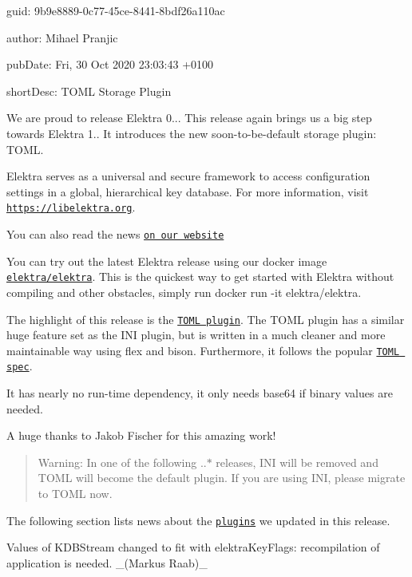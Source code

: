 
\begin{DoxyItemize}
\item guid\+: 9b9e8889-\/0c77-\/45ce-\/8441-\/8bdf26a110ac
\item author\+: Mihael Pranjic
\item pub\+Date\+: Fri, 30 Oct 2020 23\+:03\+:43 +0100
\item short\+Desc\+: T\+O\+ML Storage Plugin
\end{DoxyItemize}

We are proud to release Elektra 0... This release again brings us a big step towards Elektra 1.. It introduces the new soon-\/to-\/be-\/default storage plugin\+: T\+O\+ML.

Elektra serves as a universal and secure framework to access configuration settings in a global, hierarchical key database. For more information, visit \href{https://libelektra.org}{\tt https\+://libelektra.\+org}.

You can also read the news \href{https://www.libelektra.org/news/0.9.3-release}{\tt on our website}

You can try out the latest Elektra release using our docker image \href{https://hub.docker.com/r/elektra/elektra}{\tt elektra/elektra}. This is the quickest way to get started with Elektra without compiling and other obstacles, simply run {\ttfamily docker run -\/it elektra/elektra}.

The highlight of this release is the \href{https://www.libelektra.org/plugins/toml}{\tt T\+O\+ML plugin}. The T\+O\+ML plugin has a similar huge feature set as the I\+NI plugin, but is written in a much cleaner and more maintainable way using flex and bison. Furthermore, it follows the popular \href{https://toml.io}{\tt T\+O\+ML spec}.

It has nearly no run-\/time dependency, it only needs {\ttfamily base64} if binary values are needed.

A huge thanks to Jakob Fischer for this amazing work!

\begin{quote}
Warning\+: In one of the following {..$\ast$} releases, I\+NI will be removed and T\+O\+ML will become the default plugin. If you are using I\+NI, please migrate to T\+O\+ML now. \end{quote}


The following section lists news about the \href{https://www.libelektra.org/plugins/readme}{\tt plugins} we updated in this release.


\begin{DoxyItemize}
\item Values of K\+D\+B\+Stream changed to fit with elektra\+Key\+Flags\+: recompilation of application is needed. \+\_\+(\+Markus Raab)\+\_\+
\end{DoxyItemize}


